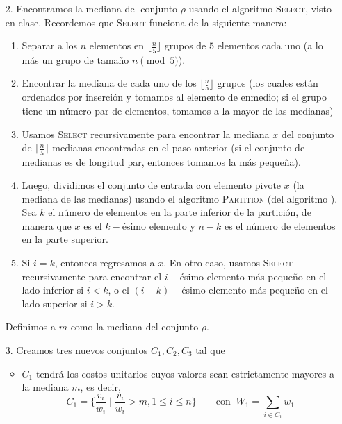 \documentclass[letterpaper,11pt]{article}
\begin{document}
\begin{enumerate}
\begin{itemize}
\begin{itemize}
            \item[2.] Encontramos la mediana del conjunto $\rho$ usando el 
            algoritmo \textsc{Select}, visto en clase. Recordemos que 
            \textsc{Select} funciona de la siguiente manera:
            \begin{enumerate}
                \item Separar a los $n$ elementos en $\lfloor \frac{n}{5} \rfloor$ 
                grupos de $5$ elementos cada uno (a lo más un grupo de tamaño 
                $n \pmod{5}$).

                \item Encontrar la mediana de cada uno de los 
                $\lfloor \frac{n}{5} \rfloor$ grupos (los cuales están ordenados 
                por inserción y tomamos al elemento de enmedio; si el grupo tiene 
                un número par de elementos, tomamos a la mayor de las medianas)

                \item Usamos \textsc{Select} recursivamente para encontrar la 
                mediana $x$ del conjunto de $\lceil \frac{n}{5} \rceil$ medianas 
                encontradas en el paso anterior (si el conjunto de medianas es de 
                longitud par, entonces tomamos la más pequeña). 

                \item Luego, dividimos el conjunto de entrada con elemento pivote 
                $x$ (la mediana de las medianas) usando el algoritmo 
                \textsc{Partition} (del algoritmo ). Sea $k$ el 
                número de elementos en la parte inferior de la partición, de 
                manera que $x$ es el $k-$ésimo elemento y $n-k$ es el número de 
                elementos en la parte superior.

                \item Si $i = k$, entonces regresamos a $x$. En otro caso, 
                usamos \textsc{Select} recursivamente para encontrar el 
                $i-$ésimo elemento más pequeño en el lado inferior si $i < k$, o 
                el $(i-k)-$ésimo elemento más pequeño en el lado superior si 
                $i > k$.
            \end{enumerate}

            Definimos a $m$ como la mediana del conjunto $\rho$.
            
            \item[3.] Creamos tres nuevos conjuntos $C_1, C_2, C_3$ tal que 
            \begin{itemize}
                \item $C_1$ tendrá los costos unitarios cuyos valores sean 
                estrictamente mayores a la mediana $m$, es decir, 
                \begin{equation*}
                    C_1 = \{\frac{v_i}{w_i} \; | \; \frac{v_i}{w_i} > m, 
                    1 \leq i \leq n\}
                    \quad \quad \text{con} \; \; 
                    W_1 = \sum_{i \in C_1} w_1
                \end{equation*}


\end{itemize}
\end{itemize}
\end{itemize}
\end{enumerate}
\end{document}
